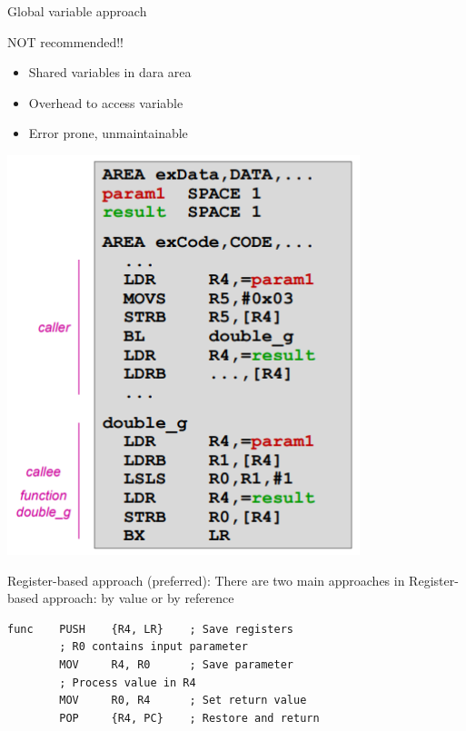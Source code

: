 \begin{concept}{Global variable approach}

\begin{minipage}{0.5\linewidth}
NOT recommended!!
\vspace{2mm}\\
\begin{itemize}
  \item Shared variables in dara area
  \item Overhead to access variable
  \item Error prone, unmaintainable
\end{itemize}
\end{minipage}
\begin{minipage}{0.5\linewidth}
  \vspace{-4mm}
\includegraphics[width=0.8\linewidth]{images/global_variables.png}
\end{minipage}
\end{concept}

\begin{concept}{Register-based approach} (preferred):
  There are two main approaches in Register-based approach:
  by value or by reference
\begin{lstlisting}[language=armasm, style=basesmol]
func    PUSH    {R4, LR}    ; Save registers
        ; R0 contains input parameter
        MOV     R4, R0      ; Save parameter
        ; Process value in R4
        MOV     R0, R4      ; Set return value
        POP     {R4, PC}    ; Restore and return
\end{lstlisting}
\end{concept}

